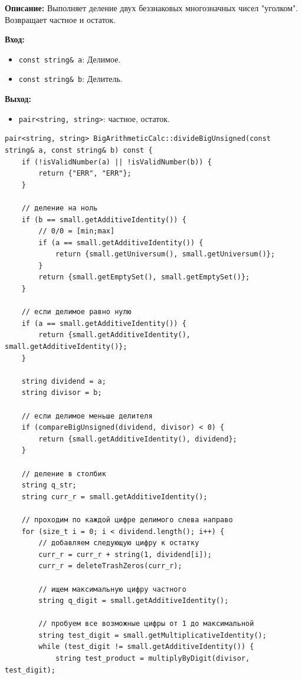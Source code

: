 \textbf{Описание:} Выполняет деление двух беззнаковых многозначных чисел "уголком".  Возвращает частное и остаток.

\textbf{Вход: }
\begin{itemize}
    \item \texttt{const string\& a}: Делимое.
    \item \texttt{const string\& b}: Делитель.
\end{itemize}

\textbf{Выход:}
\begin{itemize}
    \item \texttt{pair<string, string>}: частное, остаток.
\end{itemize}

\begin{lstlisting}[style=cstyle, caption={Реализация divideBigUnsigned()}]
pair<string, string> BigArithmeticCalc::divideBigUnsigned(const string& a, const string& b) const {
    if (!isValidNumber(a) || !isValidNumber(b)) {
        return {"ERR", "ERR"};
    }
    
    // деление на ноль
    if (b == small.getAdditiveIdentity()) {
        // 0/0 = [min;max]
        if (a == small.getAdditiveIdentity()) {
            return {small.getUniversum(), small.getUniversum()};
        }
        return {small.getEmptySet(), small.getEmptySet()};
    }
    
    // если делимое равно нулю
    if (a == small.getAdditiveIdentity()) {
        return {small.getAdditiveIdentity(), small.getAdditiveIdentity()};
    }
    
    string dividend = a;
    string divisor = b;
    
    // если делимое меньше делителя
    if (compareBigUnsigned(dividend, divisor) < 0) {
        return {small.getAdditiveIdentity(), dividend};
    }
    
    // деление в столбик
    string q_str;
    string curr_r = small.getAdditiveIdentity();
    
    // проходим по каждой цифре делимого слева направо
    for (size_t i = 0; i < dividend.length(); i++) {
        // добавляем следующую цифру к остатку
        curr_r = curr_r + string(1, dividend[i]);
        curr_r = deleteTrashZeros(curr_r);
        
        // ищем максимальную цифру частного
        string q_digit = small.getAdditiveIdentity();
        
        // пробуем все возможные цифры от 1 до максимальной
        string test_digit = small.getMultiplicativeIdentity();
        while (test_digit != small.getAdditiveIdentity()) {
            string test_product = multiplyByDigit(divisor, test_digit);
            

\end{lstlisting}
